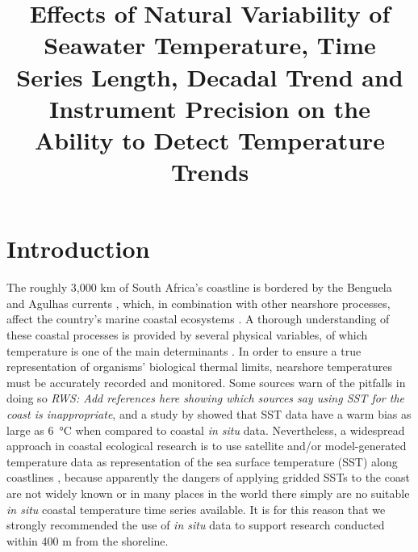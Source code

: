 \documentclass[]{ametsoc}
\title{Effects of Natural Variability of Seawater Temperature, Time Series Length, Decadal Trend and Instrument Precision on the Ability to Detect Temperature Trends}
\affiliation{Department of Biodiversity and Conservation Biology, University of the Western Cape, Bellville, Republic of South Africa}
\begin{document}
\maketitle

\section{Introduction}
The roughly 3,000 km of South Africa's coastline is bordered by the Benguela and Agulhas currents \citep[e.g.][]{Roberts2005,Hutchings2009}, which, in combination with other nearshore processes, affect the country's marine coastal ecosystems \citep{Santos2012a}. A thorough understanding of these coastal processes is provided by several physical variables, of which temperature is one of the main determinants \citep[e.g.][]{Blanchette2008, Tittensor2010, Couce2012}. In order to ensure a true representation of organisms' biological thermal limits, nearshore temperatures must be accurately recorded and monitored. Some sources warn of the pitfalls in doing so \emph{RWS: Add references here showing which sources say using SST for the coast is inappropriate}, and a study by \citet{Smit2013} showed that SST data have a warm bias as large as \SI{6}{\degreeCelsius} when compared to coastal \emph{in situ} data. Nevertheless, a widespread approach in coastal ecological research is to use satellite and/or model-generated temperature data as representation of the sea surface temperature (SST) along coastlines \citep[e.g.][]{Blanchette2008, Broitman2008a, Tyberghein2012}, because apparently the dangers of applying gridded SSTs to the coast are not widely known or in many places in the world there simply are no suitable \emph{in situ} coastal temperature time series available. It is for this reason that we strongly recommended the use of \emph{in situ} data to support research conducted within 400 m from the shoreline.
\end{document}
